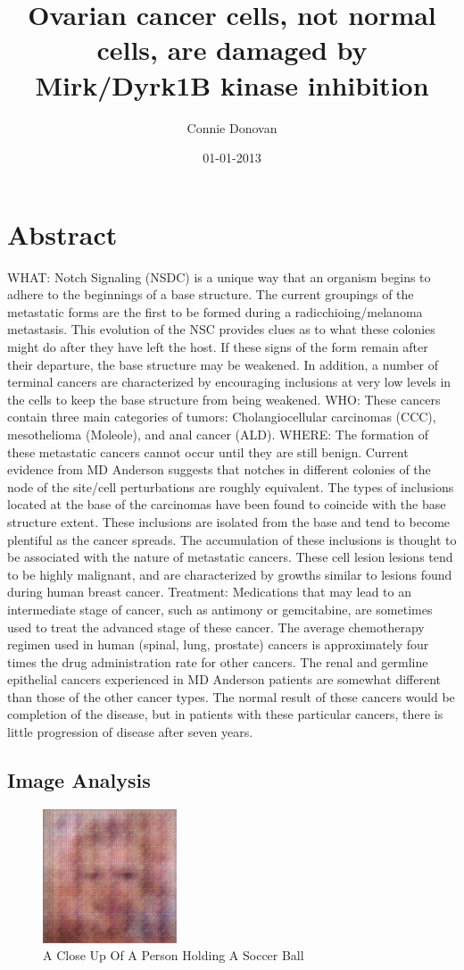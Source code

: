 \documentclass{article}%
\title{Ovarian cancer cells, not normal cells, are damaged by Mirk/Dyrk1B kinase inhibition}%
\author{Connie Donovan}%
\affil{Department of Surgery, University of Wisconsin Hospital and Clinics, Madison, Wisconsin, United States of America}%
\date{01{-}01{-}2013}%
\begin{document}
%
\normalsize%
\maketitle%
\section{Abstract}%
\label{sec:Abstract}%
WHAT: Notch Signaling (NSDC) is a unique way that an organism begins to adhere to the beginnings of a base structure. The current groupings of the metastatic forms are the first to be formed during a radicchioing/melanoma metastasis. This evolution of the NSC provides clues as to what these colonies might do after they have left the host. If these signs of the form remain after their departure, the base structure may be weakened. In addition, a number of terminal cancers are characterized by encouraging inclusions at very low levels in the cells to keep the base structure from being weakened.\newline%
WHO: These cancers contain three main categories of tumors: Cholangiocellular carcinomas (CCC), mesothelioma (Moleole), and anal cancer (ALD).\newline%
WHERE: The formation of these metastatic cancers cannot occur until they are still benign. Current evidence from MD Anderson suggests that notches in different colonies of the node of the site/cell perturbations are roughly equivalent. The types of inclusions located at the base of the carcinomas have been found to coincide with the base structure extent. These inclusions are isolated from the base and tend to become plentiful as the cancer spreads. The accumulation of these inclusions is thought to be associated with the nature of metastatic cancers. These cell lesion lesions tend to be highly malignant, and are characterized by growths similar to lesions found during human breast cancer.\newline%
Treatment: Medications that may lead to an intermediate stage of cancer, such as antimony or gemcitabine, are sometimes used to treat the advanced stage of these cancer.\newline%
The average chemotherapy regimen used in human (spinal, lung, prostate) cancers is approximately four times the drug administration rate for other cancers. The renal and germline epithelial cancers experienced in MD Anderson patients are somewhat different than those of the other cancer types. The normal result of these cancers would be completion of the disease, but in patients with these particular cancers, there is little progression of disease after seven years.

%
\subsection{Image Analysis}%
\label{subsec:ImageAnalysis}%


\begin{figure}[h!]%
\centering%
\includegraphics[width=150px]{500_fake_images/samples_5_281.png}%
\caption{A Close Up Of A Person Holding A Soccer Ball}%
\end{figure}

%
\end{document}
